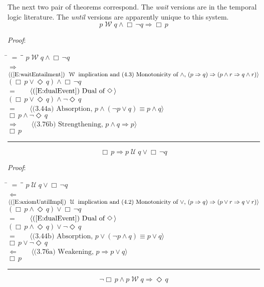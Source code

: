 \documentclass[12pt, fleqn, leqno]{article}
\newcommand{\lgap}{2pt}                             %
\newcommand{\mymathindent}{24pt}                    %
\newcommand{\impl}{\ensuremath{\Rightarrow}}        %
\newcommand{\foll}{\ensuremath{\Leftarrow}}         %
\newcommand{\Until}{\;\mathcal{U}\;}
\newcommand{\Wait}{\;\mathcal{W}\;}
\newcommand{\Event}{\Diamond\,}
\newcommand{\Always}{\Box\,}
\newcommand{\myqed}{\rule[-.23ex]{1.2ex}{2.0ex}}
\newcommand{\myqedtab}{\hspace{384pt}}              %
\newcommand{\Gll} {\langle}                         %
\newcommand{\Ggg} {\rangle}                         %
\newcommand{\Hint}[1]     {\ \ \ $\Gll              \mbox{#1} \Ggg$ }   %
\begin{document}
The next two pair of theorems correspond.
The \textit{wait} versions are in the temporal logic literature.
The \textit{until} versions are apparently unique to this system.
\begin{equation}\label{E:waitEntailAlways}
p \Wait q \land \Always\neg q \impl \Always p
\end{equation}

\emph{Proof}:
\begin{tabbing}
\hspace{\mymathindent} \= $= \;$ \= \myqedtab \= \kill
\> \> $p \Wait q \land \Always\neg q$\\[\lgap]
\> $\impl$ \> \Hint{(\ref{E:waitEntailment}) $\Wait$ implication and (4.3) Monotonicity of $\land$, $(p\impl q)\impl (p\land r \impl q\land r)$} \\[\lgap]
\> \> $(\Always p \lor \Event q) \land \Always\neg q$\\[\lgap]
  \> $=$  \>  \Hint{(\ref{E:dualEvent}) Dual of $\Event$}\\[\lgap]
\> \> $(\Always p \lor \Event q) \land \neg \Event q$\\[\lgap]
\> $=$ \> \Hint{(3.44a) Absorption, $p\land (\neg p\lor q)\equiv p\land q$} \\[\lgap]
\> \> $\Always p \land \neg \Event q$\\[\lgap]
\> $\impl$ \> \Hint{(3.76b) Strengthening, $p\land q \impl p$} \\[\lgap]
\> \> $\Always p$ \quad \myqed
\end{tabbing}
\begin{equation}\label{E:untilEntailAlways}
\Always p\impl p \Until q \lor \Always\neg q 
\end{equation}

\emph{Proof}:
\begin{tabbing}
\hspace{\mymathindent} \= $= \;$ \= \myqedtab \= \kill
\> \> $p \Until q \lor \Always\neg q$\\[\lgap]
\> $\foll$ \> \Hint{(\ref{E:axiomUntilImpl}) $\Until$ implication and (4.2) Monotonicity of $\lor$, $(p\impl q)\impl (p\lor r \impl q\lor r)$} \\[\lgap]
\> \> $(\Always p \land \Event q) \lor \Always\neg q$\\[\lgap]
\> $=$  \>  \Hint{(\ref{E:dualEvent}) Dual of $\Event$}\\[\lgap]
\> \> $(\Always p \land \Event q) \lor \neg \Event q$\\[\lgap]
\> $=$  \>  \Hint{(3.44b) Absorption, $p \lor (\neg p \land q) \equiv p \lor q$}\\[\lgap]
\> \> $\Always p \lor \neg \Event q$\\[\lgap]
\> $\foll$ \> \Hint{(3.76a) Weakening, $p\impl p\lor q$} \\[\lgap]
\> \> $\Always p$ \quad \myqed
\end{tabbing}
\begin{equation}\label{E:waitEntailEvent}
\neg\Always p\land p \Wait q \impl \Event q
\end{equation}
\end{document}
